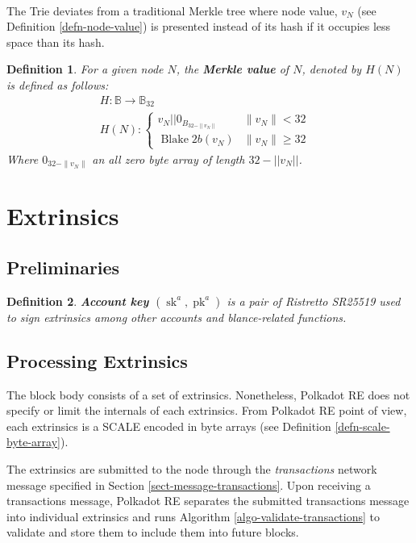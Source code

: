 \documentclass{article}
\newcommand{\tmem}[1]{{\em #1\/}}
\newcommand{\tmop}[1]{\ensuremath{\operatorname{#1}}}
\newcommand{\tmstrong}[1]{\textbf{#1}}
\newcommand{\tmtextbf}[1]{{\bfseries{#1}}}
\newcommand{\tmtextit}[1]{{\itshape{#1}}}
\newtheorem{definition}{Definition}
\providecommand{\tmem}[1]{\tmtextit{#1}}
\providecommand{\tmop}[1]{\ensuremath{\mathrm{#1}}}
\providecommand{\tmstrong}[1]{\tmtextbf{#1}}
\providecommand{\tmtextbf}[1]{\tmtextbf{#1}}
\providecommand{\tmtextit}[1]{\tmtextit{#1}}
\newtheorem{definition}{Definition}
\begin{document}
\

The Trie deviates from a traditional Merkle tree where node value, $v_N$ (see
Definition \ref{defn-node-value}) is presented instead of its hash if it
occupies less space than its hash.

\begin{definition}
  \label{defn-merkle-value}For a given node $N$, the {\tmstrong{Merkle value}}
  of $N$, denoted by $H (N)$ is defined as follows:
  \[ \begin{array}{lll}
       & H : \mathbb{B} \rightarrow \mathbb{B}_{32} & \\
       & H (N) : \left\{ \begin{array}{lll}
         v_N | | 0_{B_{32 - \| v_N \|}} & \|v_N \|< 32 & \\
         \tmop{Blake} 2 b (v_N) & \|v_N \| \geqslant 32 & 
       \end{array} \right. & 
     \end{array} \]
  Where $0_{32 - \| v_N \|}$ an all zero byte array of length $32 - | | v_N |
  |$.
\end{definition}

\section{Extrinsics}

\subsection{Preliminaries}

\begin{definition}
  \label{defn-account-key}{\tmstrong{Account key $(\tmop{sk}^a,
  \tmop{pk}^a)$}} is a pair of Ristretto SR25519 used to sign extrinsics among
  other accounts and blance-related functions.
\end{definition}

\subsection{Processing Extrinsics}

The block body consists of a set of extrinsics. Nonetheless, Polkadot RE does
not specify or limit the internals of each extrinsics. From Polkadot RE point
of view, each extrinsics is a SCALE encoded in byte arrays (see Definition
\ref{defn-scale-byte-array}).

The extrinsics are submitted to the node through the {\tmem{transactions}}
network message specified in Section \ref{sect-message-transactions}. Upon
receiving a transactions message, Polkadot RE separates the submitted
transactions message into individual extrinsics and runs Algorithm
\ref{algo-validate-transactions} to validate and store them to include them
into future blocks.
\end{document}
